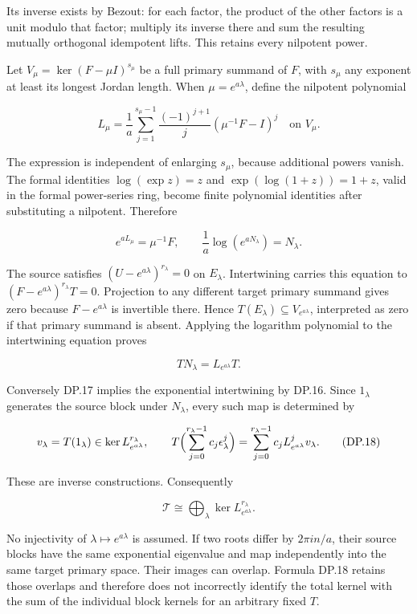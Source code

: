 Its inverse exists by Bezout: for each factor, the product of the other factors is a unit modulo that factor; multiply its inverse there and sum the resulting mutually orthogonal idempotent lifts. This retains every nilpotent power.

Let \(V_\mu=\ker(F-\mu I)^{s_\mu}\) be a full primary summand of \(F\), with \(s_\mu\) any exponent at least its longest Jordan length. When \(\mu=e^{a\lambda}\), define the nilpotent polynomial

\[
L_\mu=\frac1a\sum_{j=1}^{s_\mu-1}
 \frac{(-1)^{j+1}}j(\mu^{-1}F-I)^j
\quad\text{on }V_\mu.
\tag{DP.15}
\]

The expression is independent of enlarging \(s_\mu\), because additional powers vanish. The formal identities \(\log(\exp z)=z\) and \(\exp(\log(1+z))=1+z\), valid in the formal power-series ring, become finite polynomial identities after substituting a nilpotent. Therefore

\[
e^{aL_\mu}=\mu^{-1}F,
\qquad \frac1a\log(e^{aN_\lambda})=N_\lambda.
\tag{DP.16}
\]

The source satisfies \((U-e^{a\lambda})^{r_\lambda}=0\) on \(E_\lambda\). Intertwining carries this equation to \((F-e^{a\lambda})^{r_\lambda}T=0\). Projection to any different target primary summand gives zero because \(F-e^{a\lambda}\) is invertible there. Hence \(T(E_\lambda)\subseteq V_{e^{a\lambda}}\), interpreted as zero if that primary summand is absent. Applying the logarithm polynomial to the intertwining equation proves

\[
TN_\lambda=L_{e^{a\lambda}}T.
\tag{DP.17}
\]

Conversely DP.17 implies the exponential intertwining by DP.16. Since \(1_\lambda\) generates the source block under \(N_\lambda\), every such map is determined by

\[
v_\lambda=T(1_\lambda)\in
 \ker L_{e^{a\lambda}}^{r_\lambda},
\qquad
T\Bigl(\sum_{j=0}^{r_\lambda-1}c_j\epsilon_\lambda^j\Bigr)
=\sum_{j=0}^{r_\lambda-1}c_jL_{e^{a\lambda}}^jv_\lambda.
\tag{DP.18}
\]

These are inverse constructions. Consequently

\[
\mathscr T\cong
\bigoplus_\lambda\ker L_{e^{a\lambda}}^{r_\lambda}.
\tag{DP.19}
\]

No injectivity of \(\lambda\mapsto e^{a\lambda}\) is assumed. If two roots differ by \(2\pi i n/a\), their source blocks have the same exponential eigenvalue and map independently into the same target primary space. Their images can overlap. Formula DP.18 retains those overlaps and therefore does not incorrectly identify the total kernel with the sum of the individual block kernels for an arbitrary fixed \(T\).

